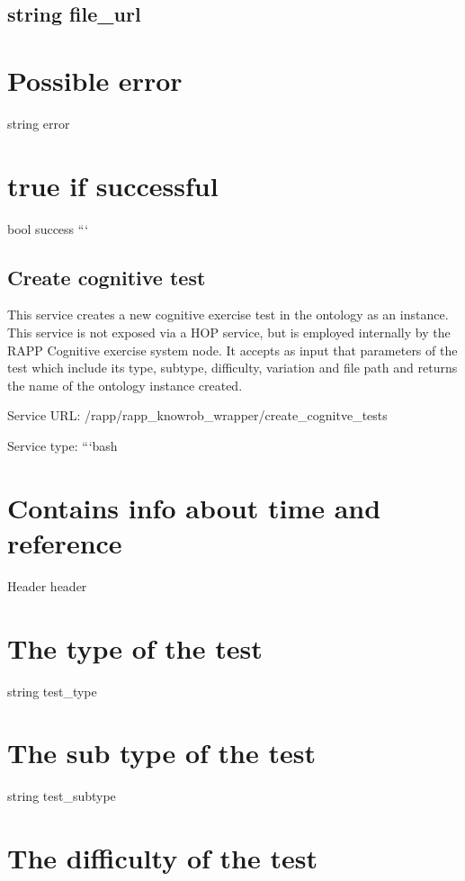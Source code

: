 \subsection*{string file\-\_\-url }

\section*{Possible error}

string error \section*{true if successful}

bool success ```

\subsection*{Create cognitive test}

This service creates a new cognitive exercise test in the ontology as an instance. This service is not exposed via a H\-O\-P service, but is employed internally by the R\-A\-P\-P Cognitive exercise system node. It accepts as input that parameters of the test which include its type, subtype, difficulty, variation and file path and returns the name of the ontology instance created.

Service U\-R\-L\-: {\ttfamily /rapp/rapp\-\_\-knowrob\-\_\-wrapper/create\-\_\-cognitve\-\_\-tests}

Service type\-: ```bash \section*{Contains info about time and reference}

Header header \section*{The type of the test}

string test\-\_\-type \section*{The sub type of the test}

string test\-\_\-subtype \section*{The difficulty of the test}

